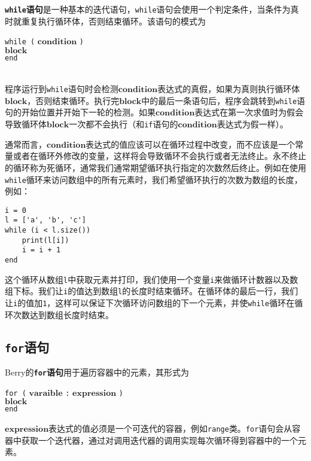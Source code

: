 \textbf{\texttt{while}语句}是一种基本的迭代语句，\texttt{while}语句会使用一个判定条件，当条件为真时就重复执行循环体，否则结束循环。该语句的模式为
\begin{algorithm}
    \texttt{while (} $\bm{condition}$ \texttt{)} \\
        \qquad $\bm{block}$ \\
    \texttt{end}
\end{algorithm}\vspace{-0.6em}\\
程序运行到\texttt{while}语句时会检测$\bm{condition}$表达式的真假，如果为真则执行循环体$\bm{block}$，否则结束循环。执行完$\bm{block}$中的最后一条语句后，程序会跳转到\texttt{while}语句的开始位置并开始下一轮的检测。如果$\bm{condition}$表达式在第一次求值时为假会导致循环体$\bm{block}$一次都不会执行（和\texttt{if}语句的$\bm{condition}$表达式为假一样）。

通常而言，$\bm{condition}$表达式的值应该可以在循环过程中改变，而不应该是一个常量或者在循环外修改的变量，这样将会导致循环不会执行或者无法终止。永不终止的循环称为死循环，通常我们通常期望循环执行指定的次数然后终止。例如在使用\texttt{while}循环来访问数组中的所有元素时，我们希望循环执行的次数为数组的长度，例如：
\begin{lstlisting}[language=berry, numbers=none]
i = 0
l = ['a', 'b', 'c']
while (i < l.size())
    print(l[i])
    i = i + 1
end
\end{lstlisting}
这个循环从数组\texttt{l}中获取元素并打印，我们使用一个变量\texttt{i}来做循环计数器以及数组下标。我们让\texttt{i}的值达到数组\texttt{l}的长度时结束循环。在循环体的最后一行，我们让\texttt{i}的值加\texttt{1}，这样可以保证下次循环访问数组的下一个元素，并使\texttt{while}循环在循环次数达到数组长度时结束。

\subsection{\texttt{for}语句}

Berry的\textbf{\texttt{for}语句}用于遍历容器中的元素，其形式为
\begin{algorithm}
    \texttt{for (} $\bm{varaible}$ \texttt{:} $\bm{expression}$ \texttt{)} \\
        \qquad $\bm{block}$ \\
    \texttt{end}
\end{algorithm}\vspace{-0.6em}

$\bm{expression}$表达式的值必须是一个可迭代的容器，例如\texttt{range}类。\texttt{for}语句会从容器中获取一个迭代器，通过对调用迭代器的调用实现每次循环得到容器中的一个元素。

